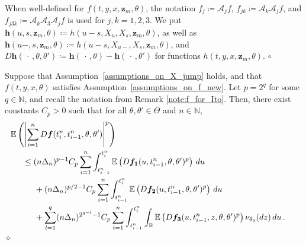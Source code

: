 \documentclass[11pt,a4paper]{article}
\newcommand{\thetan}{{\theta_0}}
\newcommand{\tminus}{{t_{i-1}^n}}
\newcommand{\tplus}{{t_i^n}}
\newcommand{\EE}{{\mathbb E}}
\newcommand{\RR}{{\mathbb R}}
\newcommand{\NN}{{\mathbb N}}
\newcommand{\aaa}{{\mathcal{A}}}
\newcommand{\dqed}{{\leavevmode \unskip \penalty9999 \hbox{} \nobreak \hfill \quad \hbox{$\diamond$}}}
\newcommand{\cqed}{{\leavevmode \unskip \penalty9999 \hbox{} \nobreak \hfill \quad \hbox{$\circ$}}}
\numberwithin{equation}{section}
\numberwithin{theorem}{section}
\begin{document}
%
\begin{remark}
When well-defined for $f(t,y,x, \mathbf{z}_m,
\theta)$, the notation $f_j \coloneqq\aaa_j f$, $f_{jk}\coloneqq\aaa_k\aaa_j
f$, and $f_{j3k} \coloneqq \aaa_k\aaa_3\aaa_j f$ is used for
$j,k=1,2,3$. We put $\bm{h}(u,s,  \mathbf{z}_m,
  \theta) \coloneqq h(u-s,X_u,X_s, \mathbf{z}_m, \theta)$, as well as $\bm{h}(u-,s,  \mathbf{z}_m,
  \theta) \coloneqq h(u-s,X_{u-},X_s, \mathbf{z}_m, \theta)$, and $D\bm{h}(\,\cdot\,, \theta,\theta') \coloneqq \bm{h}(\,\cdot\,,
\theta)-\bm{h}(\,\cdot\,, \theta')$ for functions $h (t,y,x,\mathbf{z}_m,
  \theta)$. \cqed
\label{note:f_for_Ito}
\end{remark}
%
\begin{lemma}
Suppose that Assumption~\ref{assumptions_on_X_jump} holds, and that $f(t,y,x, \theta)$ satisfies
Assumption~\ref{assumptions_on_f_new}. Let $p = 2^q$ for
some $q \in \NN$, and recall the notation from Remark
\ref{note:f_for_Ito}. 
Then, there exist constants
$C_p>0$  such that for all $\theta,\theta' \in \Theta$ and $n\in\NN$,
\begin{align*}
\begin{split}
&\hspace{-5mm} \EE\left( \left| \sum_{i=1}^n D\bm{f}(\tplus, \tminus,\theta,\theta') \right|^p\right)\\
&\leq  (n\Delta_n)^{p-1} C_p\sum_{i=1}^n\int_\tminus^\tplus
  \EE\left( D\bm{f_1}(u,\tminus,\theta,\theta')^p\right) \, du\\
&\hspace{5mm} + (n\Delta_n)^{p/2-1} C_p \sum_{i=1}^n
 \int_\tminus^\tplus  \EE\left(
D\bm{f_2}(u,\tminus,\theta,\theta')^{p}\right)\, du\\
&\hspace{5mm} + \sum_{l=1}^q (n\Delta_n)^{2^{q-l}-1}
 C_p \sum_{i=1}^n \int_\tminus^\tplus \int_\RR  \EE\left(
    D\bm{f_3}(u,\tminus,z, \theta,\theta')^{p}\right)
  \nu_\thetan(dz)\, du\,.
\end{split}
\end{align*}
\dqed
%
\label{ito_ineq_jumps_sum}
\end{lemma}
\end{document}
